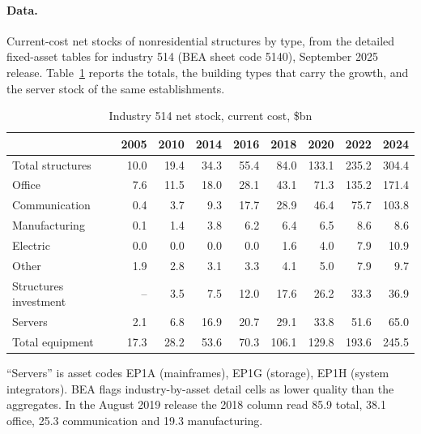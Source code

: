\documentclass[11pt]{article}
\newcommand{\bn}{\$bn}
\begin{document}
\paragraph{Data.} Current-cost net stocks of nonresidential structures by type, from the detailed fixed-asset tables for industry 514 (BEA sheet code 5140), September 2025 release. Table~\ref{tab:fa} reports the totals, the building types that carry the growth, and the server stock of the same establishments.

\begin{table}[ht]
\centering
\begin{threeparttable}
\caption{Industry 514 net stock, current cost, \bn}
\label{tab:fa}
\small
\begin{tabular}{lrrrrrrrr}
\toprule
 & 2005 & 2010 & 2014 & 2016 & 2018 & 2020 & 2022 & 2024 \\
\midrule
Total structures & 10.0 & 19.4 & 34.3 & 55.4 & 84.0 & 133.1 & 235.2 & 304.4 \\
\quad Office & 7.6 & 11.5 & 18.0 & 28.1 & 43.1 & 71.3 & 135.2 & 171.4 \\
\quad Communication & 0.4 & 3.7 & 9.3 & 17.7 & 28.9 & 46.4 & 75.7 & 103.8 \\
\quad Manufacturing & 0.1 & 1.4 & 3.8 & 6.2 & 6.4 & 6.5 & 8.6 & 8.6 \\
\quad Electric & 0.0 & 0.0 & 0.0 & 0.0 & 1.6 & 4.0 & 7.9 & 10.9 \\
\quad Other & 1.9 & 2.8 & 3.1 & 3.3 & 4.1 & 5.0 & 7.9 & 9.7 \\
\midrule
Structures investment & -- & 3.5 & 7.5 & 12.0 & 17.6 & 26.2 & 33.3 & 36.9 \\
\midrule
Servers & 2.1 & 6.8 & 16.9 & 20.7 & 29.1 & 33.8 & 51.6 & 65.0 \\
Total equipment & 17.3 & 28.2 & 53.6 & 70.3 & 106.1 & 129.8 & 193.6 & 245.5 \\
\bottomrule
\end{tabular}
\begin{tablenotes}\footnotesize
\item ``Servers'' is asset codes EP1A (mainframes), EP1G (storage), EP1H (system integrators). BEA flags industry-by-asset detail cells as lower quality than the aggregates. In the August 2019 release the 2018 column read 85.9 total, 38.1 office, 25.3 communication and 19.3 manufacturing.
\end{tablenotes}
\end{threeparttable}
\end{table}
\end{document}
